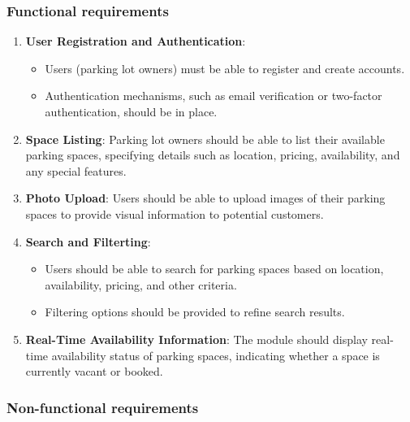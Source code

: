 \subsubsection{Functional requirements}

\begin{enumerate}
    \item \textbf{User Registration and Authentication}:
    \begin{itemize}
        \item Users (parking lot owners) must be able to register and create accounts.
        \item Authentication mechanisms, such as email verification or two-factor authentication, should be in place.
    \end{itemize}
    \item \textbf{Space Listing}: Parking lot owners should be able to list their available parking spaces, specifying details such as location, pricing, availability, and any special features.
    \item \textbf{Photo Upload}: Users should be able to upload images of their parking spaces to provide visual information to potential customers.
    \item \textbf{Search and Filterting}:
    \begin{itemize}
        \item Users should be able to search for parking spaces based on location, availability,
        pricing, and other criteria.
        \item Filtering options should be provided to refine search results.
    \end{itemize}
    \item \textbf{Real-Time Availability Information}: The module should display real-time availability status of parking spaces, indicating whether a space is currently vacant or booked.
\end{enumerate}

\subsubsection{Non-functional requirements}

